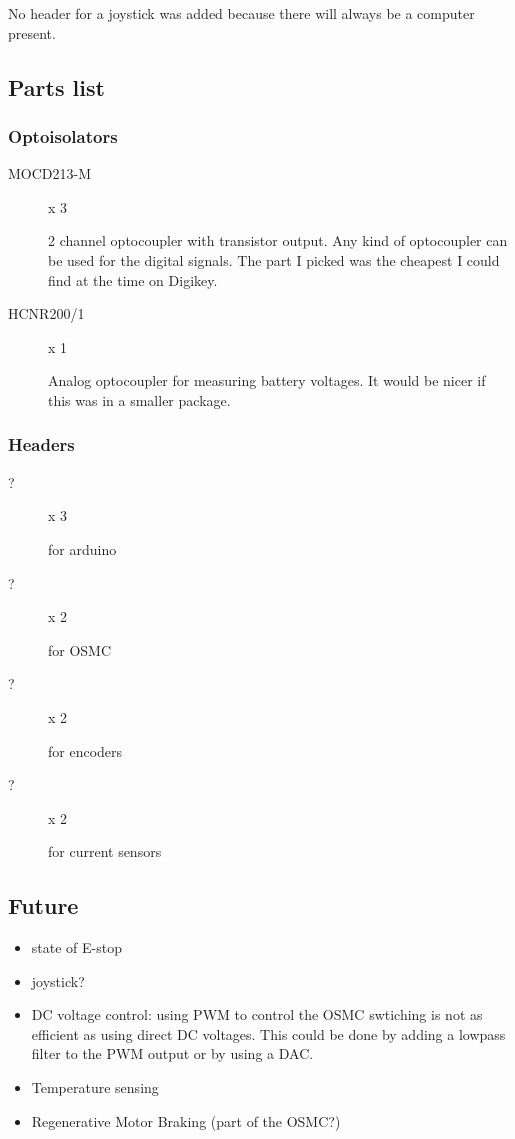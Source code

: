 \documentclass[letterpaper,12pt,notitlepage]{report}
\begin{document}
No header for a joystick was added because there will always be a computer present.

\subsection{Parts list}
\subsubsection{Optoisolators}
\begin{description}
 \item[MOCD213-M] x 3

2 channel optocoupler with transistor output.  Any kind of optocoupler can be used for the digital signals.  The part I picked was the cheapest I could find at the time on Digikey.

 \item[HCNR200/1] x 1

Analog optocoupler for measuring battery voltages.  It would be nicer if this was in a smaller package.

\end{description}

\subsubsection{Headers}
\begin{description}
 \item[?] x 3

for arduino

 \item[?] x 2

for OSMC

 \item[?] x 2

for encoders

 \item[?] x 2

for current sensors

 \end{description}

\subsection{Future}
\begin{itemize}
 \item state of E-stop
 \item joystick?
 \item DC voltage control: using PWM to control the OSMC swtiching is not as efficient as using direct DC voltages.  This could be done by adding a lowpass filter to the PWM output or by using a DAC.
 \item Temperature sensing
 \item Regenerative Motor Braking (part of the OSMC?)
\end{itemize}
\end{document}
